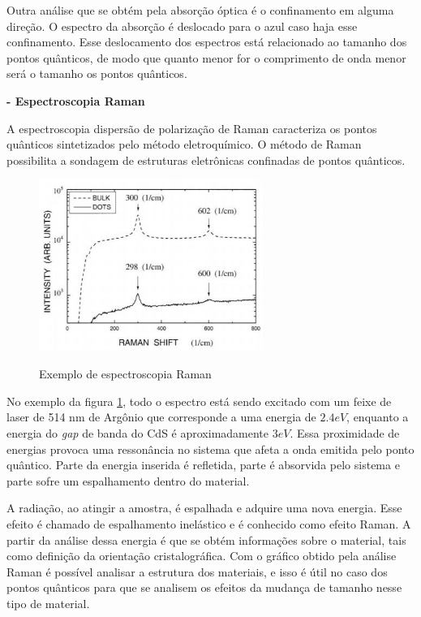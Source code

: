 		\par Outra análise que se obtém pela absorção óptica é o confinamento em alguma direção. O espectro da absorção é deslocado para o azul caso haja esse confinamento. Esse deslocamento dos espectros está relacionado ao tamanho dos pontos quânticos, de modo que quanto menor for o comprimento de onda menor será o tamanho os pontos quânticos\cite{sintese5}.

	\par \textbf{- Espectroscopia Raman}

		\par A espectroscopia dispersão de polarização de Raman caracteriza os pontos quânticos sintetizados pelo método eletroquímico. O método de Raman possibilita a sondagem de estruturas eletrônicas confinadas de pontos quânticos\cite{sintese7}.

		\begin{figure}[H]
		  \centering
		  \caption{Exemplo de espectroscopia Raman\cite{sintese7}}
		  \includegraphics[width=0.65\textwidth]{images/figura22.jpg}
		  \label{fig22}
		\end{figure}

		\par No exemplo da figura \ref{fig22}, todo o espectro está sendo excitado com um feixe de laser de 514 nm de Argônio que corresponde a uma energia de $2.4eV$, enquanto a energia do \textit{gap} de banda do CdS é aproximadamente $3eV$. Essa proximidade de energias provoca uma ressonância no sistema que afeta a onda emitida pelo ponto quântico. Parte da energia inserida é refletida, parte é absorvida pelo sistema e parte sofre um espalhamento dentro do material\cite{sintese7}.

		\par A radiação, ao atingir a amostra, é espalhada e adquire uma nova energia. Esse efeito é chamado de espalhamento inelástico e é conhecido como efeito Raman. A partir da análise dessa energia é que se obtém informações sobre o material, tais como definição da orientação cristalográfica. Com o gráfico obtido pela análise Raman é possível analisar a estrutura dos materiais, e isso é útil no caso dos pontos quânticos para que se analisem os efeitos da mudança de tamanho nesse tipo de material\cite{sintese5}.

